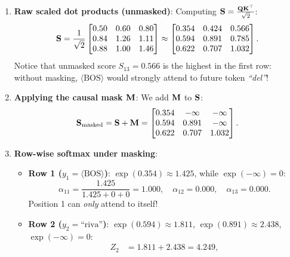 \documentclass[../../main.tex]{subfiles}
\begin{document}
\begin{enumerate}
    \item \textbf{Raw scaled dot products (unmasked)}:
    Computing $\mathbf{S} = \frac{\mathbf{Q} \mathbf{K}^\top}{\sqrt{2}}$:
    \begin{equation}
    \label{eq:dec_unmasked_scores}
    \mathbf{S} = \frac{1}{\sqrt{2}} \begin{bmatrix}
    0.50 & 0.60 & 0.80 \\
    0.84 & 1.26 & 1.11 \\
    0.88 & 1.00 & 1.46
    \end{bmatrix}
    \approx \begin{bmatrix}
    0.354 & 0.424 & 0.566 \\
    0.594 & 0.891 & 0.785 \\
    0.622 & 0.707 & 1.032
    \end{bmatrix}.
    \end{equation}
    Notice that unmasked score $S_{13} = 0.566$ is the highest in the first row: without masking, $\langle\text{BOS}\rangle$ would strongly attend to future token \emph{``del''}!
    \item \textbf{Applying the causal mask $\mathbf{M}$}:
    We add $\mathbf{M}$ to $\mathbf{S}$:
    \begin{equation}
    \label{eq:dec_masked_scores}
    \mathbf{S}_{\text{masked}} = \mathbf{S} + \mathbf{M} = \begin{bmatrix}
    0.354 & -\infty & -\infty \\
    0.594 & 0.891 & -\infty \\
    0.622 & 0.707 & 1.032
    \end{bmatrix}.
    \end{equation}
    \item \textbf{Row-wise softmax under masking}:
    \begin{itemize}
        \item \textbf{Row 1 ($y_1 = \langle\text{BOS}\rangle$)}:
        $\exp(0.354) \approx 1.425$, while $\exp(-\infty) = 0$:
        \begin{equation}
        \alpha_{11} = \frac{1.425}{1.425 + 0 + 0} = 1.000, \quad \alpha_{12} = 0.000, \quad \alpha_{13} = 0.000.
        \end{equation}
        Position 1 can \emph{only} attend to itself!
        \item \textbf{Row 2 ($y_2 = \text{``riva''}$)}:
        $\exp(0.594) \approx 1.811$, $\exp(0.891) \approx 2.438$, $\exp(-\infty) = 0$:
        \begin{align}
        Z_2 &= 1.811 + 2.438 = 4.249, \\

\end{align}
\end{itemize}
\end{enumerate}
\end{document}
